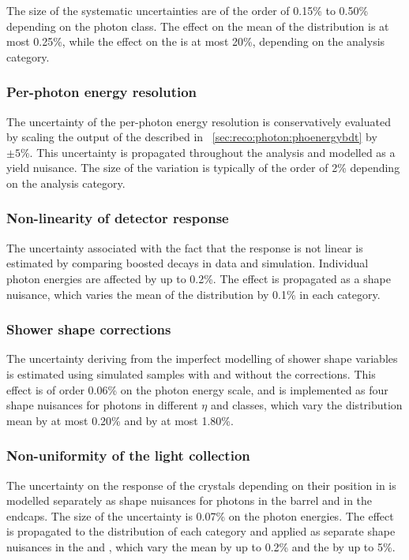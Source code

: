 The size of the systematic uncertainties are of the order of 0.15\% to 0.50\% depending on the photon class. The effect on the mean of the \mgg distribution is at most 0.25\%, while the effect on the \effSigma is at most 20\%, depending on the analysis category.

\subsubsection{Per-photon energy resolution}
The uncertainty of the per-photon energy resolution is conservatively evaluated by scaling the output of the \PhoEnergyBdt described in \Sec~\ref{sec:reco:photon:phoenergybdt} by $\pm5\%$. This uncertainty is propagated throughout the analysis and modelled as a yield nuisance. The size of the variation is typically of the order of 2\% depending on the analysis category.

\subsubsection{Non-linearity of detector response}
The uncertainty associated with the fact that the \ECAL response is not linear is estimated by comparing boosted \Zee decays in data and simulation. Individual photon energies are affected by up to 0.2\%. The effect is propagated as a shape nuisance, which varies the mean of the \mgg distribution by 0.1\% in each category.

\subsubsection{Shower shape corrections}
The uncertainty deriving from the imperfect modelling of shower shape variables is estimated using simulated samples with and without the corrections. This effect is of order 0.06\% on the photon energy scale, and is implemented as four shape nuisances for photons in different $\eta$ and \RNINE classes, which vary the \mgg distribution mean by at most 0.20\% and \effSigma by at most 1.80\%.

\subsubsection{Non-uniformity of the light collection}
The uncertainty on the response of the \ECAL crystals depending on their position in \eta is modelled separately as shape nuisances for photons in the barrel and in the endcaps. The size of the uncertainty is 0.07\% on the photon energies. The effect is propagated to the \mgg distribution of each category and applied as separate shape nuisances in the \EE and \EB, which vary the mean by up to 0.2\% and the \effSigma by up to 5\%.

